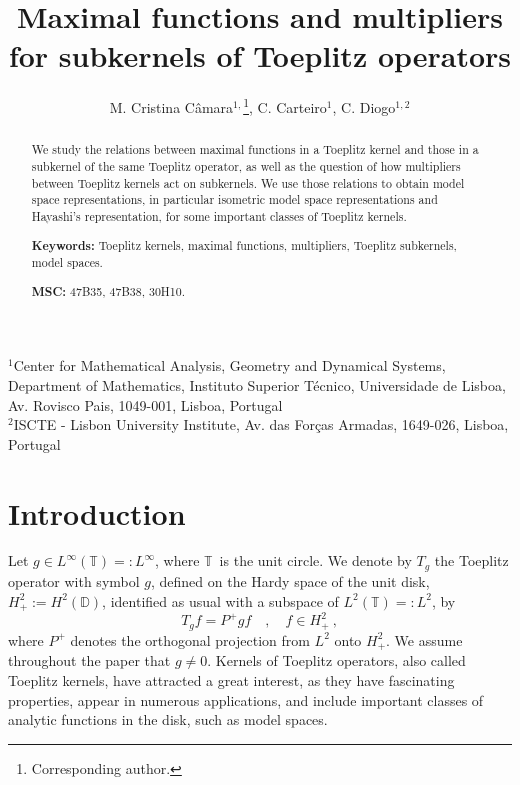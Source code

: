 \documentclass{article}
\numberwithin{equation}{section}
\theoremstyle{plain}
\newcommand{\Hp}{\ensuremath{H^2_+}}
\newcommand{\Linf}{\ensuremath{L^\infty}}
\newcommand{\TT}{\ensuremath{\mathbb{T}}}
\newcommand{\DD}{\ensuremath{\mathbb{D}}}
\begin{document}
\title{Maximal functions and multipliers for subkernels of Toeplitz operators}

\author{M. Cristina Câmara$^{1,}$\thanks{Corresponding author.},
C. Carteiro$^{1}$,
C. Diogo$^{1,2}$
}

\date{}


\maketitle

\begin{center}
$^{1}$Center for Mathematical Analysis, Geometry and Dynamical Systems, Department of Mathematics, Instituto Superior T\'ecnico, Universidade de Lisboa, Av. Rovisco Pais, 1049-001, Lisboa, Portugal\\
$^{2}$ISCTE - Lisbon University Institute, Av. das Forças Armadas, 1649-026, Lisboa, Portugal
\end{center}

\begingroup
\renewcommand\thefootnote{}
\endgroup

\begin{abstract}
We study the relations between maximal functions in a Toeplitz kernel and those in a subkernel of the same Toeplitz operator, as well as the question of how multipliers between Toeplitz kernels act on subkernels.
We use those relations to obtain model space representations, in particular isometric model space representations and Hayashi's representation, for some important classes of Toeplitz kernels.

{\bf Keywords:} Toeplitz kernels, maximal functions, multipliers, Toeplitz subkernels, model spaces.

{\bf MSC:} 47B35, 47B38, 30H10.
\end{abstract}





\section{Introduction}
\label{sec:intro}

Let $g\in\Linf(\TT) =: \Linf$, where \TT\ is the unit circle. We denote by $T_g$ the Toeplitz operator with symbol $g$, defined on the Hardy space of the unit disk, $\Hp:=H^2(\DD)$, identified as usual with a subspace of $L^2(\TT) =: L^2$, by
\begin{equation}
\label{eq:def_Toeplitz_operator}
T_g f = P^+ gf \quad , \quad f \in \Hp \ ,
\end{equation}
where $P^+$ denotes the orthogonal projection from $L^2$ onto \Hp.
We assume throughout the paper that $g \neq 0$.
Kernels of Toeplitz operators, also called Toeplitz kernels, have attracted a great interest, as they have fascinating properties, appear in numerous applications, and include important classes of analytic functions in the disk, such as model spaces.
\end{document}
